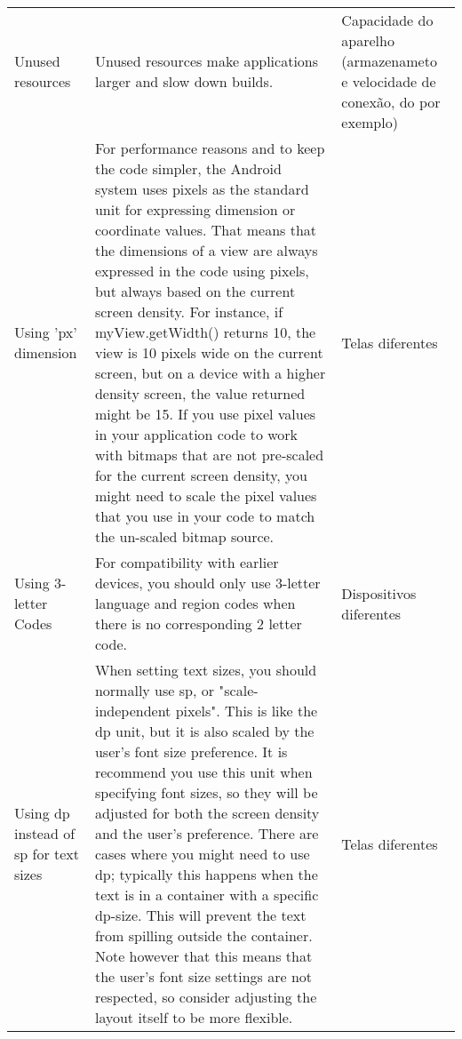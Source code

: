 \begin{landscape}
\begin{longtable}{p{30mm}|p{180mm}|p{25mm}}
Unused resources
&Unused resources make applications larger and slow down builds.
&Capacidade do aparelho (armazenameto e velocidade de conexão, do por exemplo)\\

Using 'px' dimension
&For performance reasons and to keep the code simpler, the Android system uses pixels as the standard unit for expressing dimension or coordinate values. That means that the dimensions of a view are always expressed in the code using pixels, but always based on the current screen density. For instance, if myView.getWidth() returns 10, the view is 10 pixels wide on the current screen, but on a device with a higher density screen, the value returned might be 15. If you use pixel values in your application code to work with bitmaps that are not pre-scaled for the current screen density, you might need to scale the pixel values that you use in your code to match the un-scaled bitmap source. 
&Telas diferentes\\

Using 3-letter Codes
&For compatibility with earlier devices, you should only use 3-letter language and region codes when there is no corresponding 2 letter code.
&Dispositivos diferentes\\

Using dp instead of sp for text sizes
&When setting text sizes, you should normally use sp, or "scale-independent pixels". This is like the dp unit, but it is also scaled by the user's font size preference. It is recommend you use this unit when specifying font sizes, so they will be adjusted for both the screen density and the user's preference.  There are cases where you might need to use dp; typically this happens when the text is in a container with a specific dp-size. This will prevent the text from spilling outside the container. Note however that this means that the user's font size settings are not respected, so consider adjusting the layout itself to be more flexible.
&Telas diferentes\\


\end{longtable}
\end{landscape}
